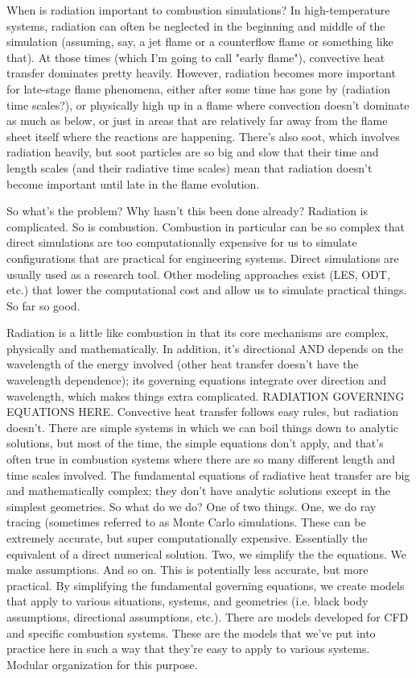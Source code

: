 \documentclass[preprint,12pt, a4paper]{elsarticle}
\begin{document}
When is radiation important to combustion simulations? In high-temperature systems, radiation can often be neglected in the beginning and middle of the simulation (assuming, say, a jet flame or a counterflow flame or something like that). At those times (which I'm going to call "early flame"), convective heat transfer dominates pretty heavily. However, radiation becomes more important for late-stage flame phenomena, either after some time has gone by (radiation time scales?), or physically high up in a flame where convection doesn't dominate as much as below, or just in areas that are relatively far away from the flame sheet itself where the reactions are happening. There's also soot, which involves radiation heavily, but soot particles are so big and slow that their time and length scales (and their radiative time scales) mean that radiation doesn't become important until late in the flame evolution. 

So what's the problem? Why hasn't this been done already? Radiation is complicated. So is combustion. Combustion in particular can be so complex that direct simulations are too computationally expensive for us to simulate configurations that are practical for engineering systems. Direct simulations are usually used as a research tool. Other modeling approaches exist (LES, ODT, etc.) that lower the computational cost and allow us to simulate practical things. So far so good. 

Radiation is a little like combustion in that its core mechanisms are complex, physically and mathematically. In addition, it's directional AND depends on the wavelength of the energy involved (other heat transfer doesn't have the wavelength dependence); its governing equations integrate over direction and wavelength, which makes things extra complicated. RADIATION GOVERNING EQUATIONS HERE.  Convective heat transfer follows easy rules, but radiation doesn't. There are simple systems in which we can boil things down to analytic solutions, but most of the time, the simple equations don't apply, and that's often true in combustion systems where there are so many different length and time scales involved. The fundamental equations of radiative heat transfer are big and mathematically complex; they don't have analytic solutions except in the simplest geometries. So what do we do? One of two things. One, we do ray tracing (sometimes referred to as Monte Carlo simulations. These can be extremely accurate, but super computationally expensive. Essentially the equivalent of a direct numerical solution. Two, we simplify the the equations. We make assumptions. And so on. This is potentially less accurate, but more practical. By simplifying the fundamental governing equations, we create models that apply to various situations, systems, and geometries (i.e. black body assumptions, directional assumptions, etc.). There are models developed for CFD and specific combustion systems. These are the models that we've put into practice here in such a way that they're easy to apply to various systems. Modular organization for this purpose.
\end{document}
